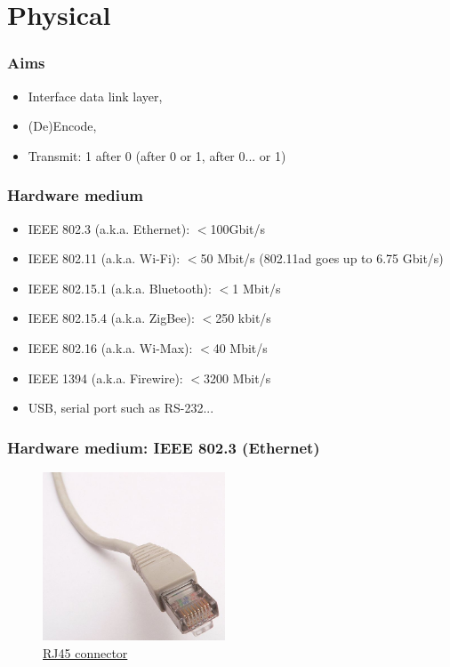 \section{Physical}
  \begin{frame}
    \frametitle{Aims}
      \begin{itemize}
        \item Interface data link layer,\pause
        \item (De)Encode,\pause
        \item Transmit: 1 after 0 (after 0 or 1, after 0... or 1)
      \end{itemize}
  \end{frame}
  \begin{frame}
    \frametitle{Hardware medium}
      \begin{itemize}
        \item IEEE 802.3 (a.k.a. Ethernet): $<$100Gbit/s \pause
        \item IEEE 802.11 (a.k.a. Wi-Fi): $<$50 Mbit/s (802.11ad goes up to 6.75 Gbit/s) \pause
        \item IEEE 802.15.1 (a.k.a. Bluetooth): $<$1 Mbit/s \pause
        \item IEEE 802.15.4 (a.k.a. ZigBee): $<$250 kbit/s \pause
        \item IEEE 802.16 (a.k.a. Wi-Max): $<$40 Mbit/s \pause
        \item IEEE 1394 (a.k.a. Firewire): $<$3200 Mbit/s \pause
        \item USB, serial port such as RS-232...
      \end{itemize}
  \end{frame}
  \begin{frame}
    \frametitle{Hardware medium: IEEE 802.3 (Ethernet)}
    \begin{figure}[t]
      \centering
      \includegraphics[height=5cm]{./imgs/rj45.jpg}
      \caption{\color{blue}\href{https://en.wikipedia.org/wiki/File:Ethernet_RJ45_connector_p1160054.jpg}{RJ45 connector}}
      \label{fig:rj45}
    \end{figure}
  \end{frame}
